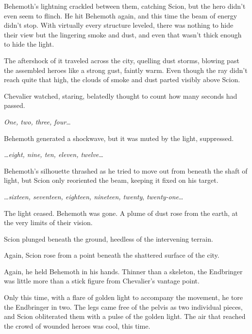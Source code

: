 Behemoth's lightning crackled between them, catching Scion, but the hero didn't even seem to flinch.  He hit Behemoth again, and this time the beam of energy didn't stop.  With virtually every structure leveled, there was nothing to hide their view but the lingering smoke and dust, and even that wasn't thick enough to hide the light.



The aftershock of it traveled across the city, quelling dust storms, blowing past the assembled heroes like a strong gust, faintly warm.  Even though the ray didn't reach quite that high, the clouds of smoke and dust parted visibly above Scion.



Chevalier watched, staring, belatedly thought to count how many seconds had passed.



\emph{One, two, three, four}\ldots



Behemoth generated a shockwave, but it was muted by the light, suppressed.



\emph{\ldots{}eight, nine, ten, eleven, twelve\ldots}



Behemoth's silhouette thrashed as he tried to move out from beneath the shaft of light, but Scion only reoriented the beam, keeping it fixed on his target.



\ldots\emph{sixteen, seventeen, eighteen, nineteen, twenty}, \emph{twenty-one}\ldots



The light ceased.  Behemoth was gone.  A plume of dust rose from the earth, at the very limits of their vision.



Scion plunged beneath the ground, heedless of the intervening terrain.



Again, Scion rose from a point beneath the shattered surface of the city.



Again, he held Behemoth in his hands.  Thinner than a skeleton, the Endbringer was little more than a stick figure from Chevalier's vantage point.



Only this time, with a flare of golden light to accompany the movement, he tore the Endbringer in two.  The legs came free of the pelvis as two individual pieces, and Scion obliterated them with a pulse of the golden light.  The air that reached the crowd of wounded heroes was cool, this time.




